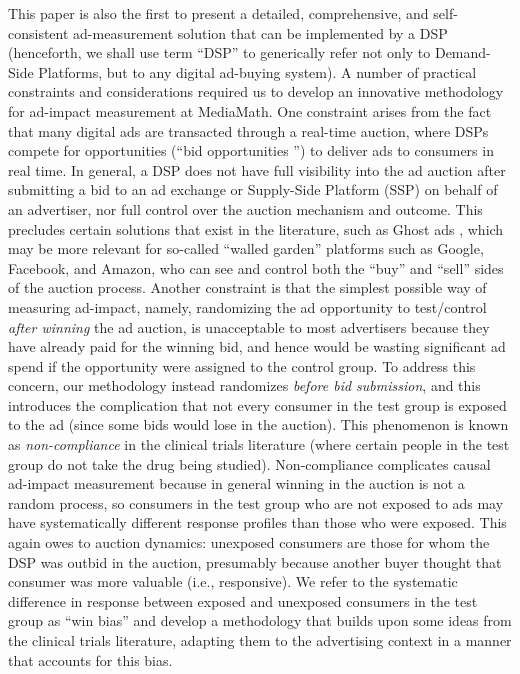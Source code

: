 \documentclass[11pt,a4paper]{article}
\theoremstyle{definition}
\theoremstyle{remark}
\theoremstyle{definition}
\theoremstyle{definition}
\theoremstyle{definition}
\theoremstyle{definition}
\theoremstyle{definition}
\theoremstyle{definition}
\begin{document}
This paper is also the first to present a detailed, comprehensive, and self-consistent ad-measurement solution that can be implemented by a DSP (henceforth, we shall use term “DSP” to generically refer not only to Demand-Side Platforms, but to any digital ad-buying system).
A number of practical constraints and considerations required us to develop an innovative methodology for ad-impact measurement at MediaMath. One constraint arises from the fact that many digital ads are transacted through a real-time auction, where DSPs compete for opportunities (“bid opportunities ”) to deliver ads to consumers in real time. 
In general, a DSP does not have full visibility into the ad auction after submitting a bid to an ad exchange or Supply-Side Platform (SSP) on behalf of an advertiser, nor full control over the auction mechanism and outcome. 
This precludes certain solutions that exist in the literature, such as Ghost ads \cite{Johnson_Ghost_2015}, which may be more relevant for so-called “walled garden” platforms such as Google, Facebook, and Amazon, who can see and control both the “buy” and “sell” sides of the auction process. 
Another constraint is that the simplest possible way of measuring ad-impact, namely, randomizing the ad opportunity to test/control \textit{after winning} the ad auction, is unacceptable to most advertisers because they have already paid for the winning bid, and hence would be wasting significant ad spend if the opportunity were assigned to the control group. 
To address this concern, our methodology instead randomizes \textit{before bid submission}, and this introduces the complication that not every consumer in the test group is exposed to the ad (since some bids would lose in the auction). 
This phenomenon is known as \textit{non-compliance} in the clinical trials literature (where certain people in the test group do not take the drug being studied). 
Non-compliance complicates causal ad-impact measurement because in general winning in the auction is not a random process, so consumers in the test group who are not exposed to ads may have systematically different response profiles than those who were exposed. This again owes to auction dynamics: unexposed consumers are those for whom the DSP was outbid in the auction, presumably because another buyer thought that consumer was more valuable (i.e., responsive). We refer to the systematic difference in response between exposed and unexposed consumers in the test group as “win bias” and develop a methodology that builds upon some ideas from the clinical trials literature, adapting them to the advertising context in a manner that accounts for this bias.
\end{document}
